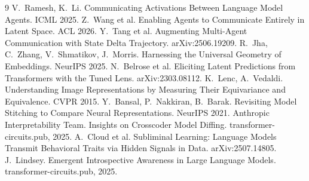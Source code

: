 \documentclass[11pt]{article}
\begin{document}
\begin{thebibliography}{9}
 V.~Ramesh, K.~Li.
Communicating Activations Between Language Model Agents. ICML 2025.
 Z.~Wang et al.
Enabling Agents to Communicate Entirely in Latent Space. ACL 2026.
 Y.~Tang et al.
Augmenting Multi-Agent Communication with State Delta Trajectory. arXiv:2506.19209.
 R.~Jha, C.~Zhang, V.~Shmatikov, J.~Morris.
Harnessing the Universal Geometry of Embeddings. NeurIPS 2025.
 N.~Belrose et al.
Eliciting Latent Predictions from Transformers with the Tuned Lens. arXiv:2303.08112.
 K.~Lenc, A.~Vedaldi.
Understanding Image Representations by Measuring Their Equivariance and Equivalence. CVPR 2015.
 Y.~Bansal, P.~Nakkiran, B.~Barak.
Revisiting Model Stitching to Compare Neural Representations. NeurIPS 2021.
 Anthropic Interpretability Team.
Insights on Crosscoder Model Diffing. transformer-circuits.pub, 2025.
 A.~Cloud et al.
Subliminal Learning: Language Models Transmit Behavioral Traits via Hidden
Signals in Data. arXiv:2507.14805.
 J.~Lindsey.
Emergent Introspective Awareness in Large Language Models.
transformer-circuits.pub, 2025.
\end{thebibliography}
\end{document}

